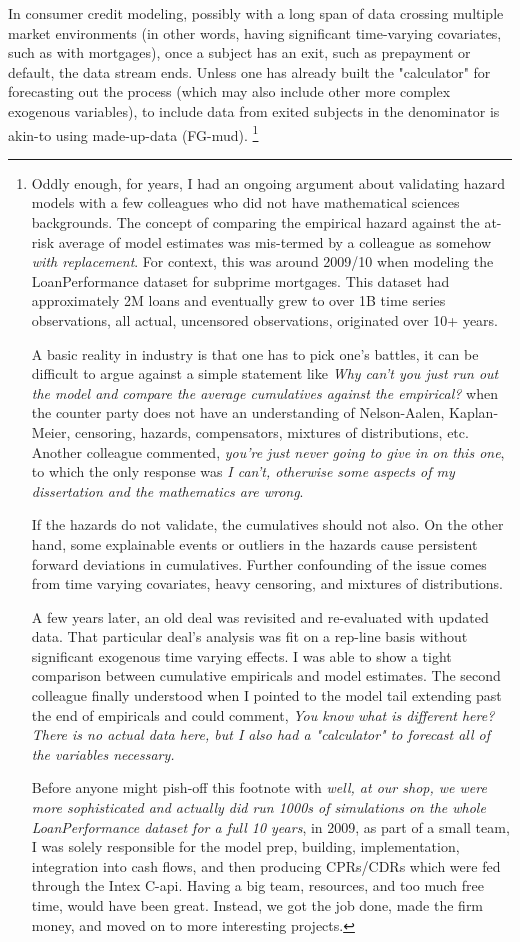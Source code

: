 \documentclass[10pt]{article}
\begin{document}
In consumer credit modeling, possibly with a long span of data crossing multiple market environments
(in other words, having significant time-varying covariates, such as with mortgages), 
once a subject has an exit, such as prepayment or default, the data stream ends.  
Unless one has already built the "calculator" for forecasting out the process (which may also include other 
more complex exogenous variables), to include
data from exited subjects in the denominator is akin-to using made-up-data (FG-mud).
\footnote{Oddly enough, for years, I had an ongoing argument about validating hazard models with a few colleagues who did not have
mathematical sciences backgrounds.
The concept of comparing the empirical hazard against the at-risk average of model estimates was mis-termed by a colleague as somehow {\em with
replacement}.  For context, this was around 2009/10 when modeling the LoanPerformance dataset for subprime mortgages.  This dataset had
approximately 2M loans and eventually grew to over 1B time series observations, all actual, uncensored observations, originated over 10+
years.

A basic reality in industry is that one has to pick one's battles, 
it can be difficult to argue against a simple statement like
{\em Why can't you just run out the model and compare the average cumulatives
against the empirical?} when the counter party does not have an understanding of Nelson-Aalen, Kaplan-Meier, censoring, hazards, compensators, mixtures of
distributions, etc.  
Another colleague commented, {\em you're just never going to give in on this one}, to which the only response was {\em I can't, otherwise some aspects of my dissertation and 
the mathematics are wrong}.  

If the hazards do not validate, the cumulatives should not also.  On the other hand, 
some explainable events or outliers in the hazards cause persistent forward deviations in cumulatives.
Further confounding of the issue comes from time varying covariates, heavy censoring, and mixtures of distributions.

A few years later, an old deal was revisited and re-evaluated with updated data.  
That particular deal's analysis was fit on a rep-line basis without significant exogenous time varying effects.  
I was able to show a tight comparison between cumulative empiricals and model estimates.
The second colleague finally understood 
when I pointed to the model tail extending past the end of empiricals and could comment, {\em You know what is different here? There is no
actual data here, but I also had a "calculator" to forecast all of the variables necessary.}

Before anyone might pish-off this footnote with {\em well, at our shop, we were more sophisticated and actually did run 1000s of simulations on the
whole LoanPerformance dataset for a full 10 years}, in 2009, as part of a small team, I was solely responsible for the model prep, building, implementation, 
integration into cash flows, and then producing CPRs/CDRs which were fed through the Intex C-api.  Having a big team, resources, and too
much free time, would have been great. Instead, we got the job done, made the firm money, and moved on to more interesting projects.
}
\end{document}
